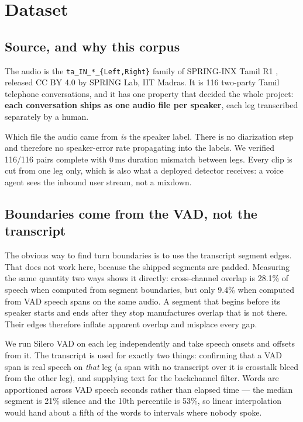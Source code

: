 \documentclass[11pt]{article}
\newcommand{\pct}{\%}
\begin{document}
\section{Dataset}
\label{sec:data}

\subsection{Source, and why this corpus}

The audio is the \texttt{ta\_IN\_*\_\{Left,Right\}} family of
SPRING-INX Tamil R1 \cite{springinx}, released CC BY 4.0 by SPRING Lab, IIT
Madras. It is 116 two-party Tamil telephone conversations, and it has one
property that decided the whole project: \textbf{each conversation ships as one
audio file per speaker}, each leg transcribed separately by a human.

Which file the audio came from \emph{is} the speaker label. There is no
diarization step and therefore no speaker-error rate propagating into the
labels. We verified 116/116 pairs complete with 0\,ms duration mismatch between
legs. Every clip is cut from one leg only, which is also what a deployed
detector receives: a voice agent sees the inbound user stream, not a mixdown.

\subsection{Boundaries come from the VAD, not the transcript}

The obvious way to find turn boundaries is to use the transcript segment edges.
That does not work here, because the shipped segments are padded. Measuring the
same quantity two ways shows it directly: cross-channel overlap is 28.1\pct{} of
speech when computed from segment boundaries, but only 9.4\pct{} when computed
from VAD speech spans on the same audio. A segment that begins before its speaker
starts and ends after they stop manufactures overlap that is not there. Their
edges therefore inflate apparent overlap and misplace every gap.

We run Silero VAD \cite{silero} on each leg independently and take speech
onsets and offsets from it. The transcript is used for exactly two things:
confirming that a VAD span is real speech on \emph{that} leg (a span with no
transcript over it is crosstalk bleed from the other leg), and supplying text
for the backchannel filter. Words are apportioned across VAD speech seconds
rather than elapsed time --- the median segment is 21\pct{} silence and the
10th percentile is 53\pct{}, so linear interpolation would hand about a fifth
of the words to intervals where nobody spoke.
\end{document}
